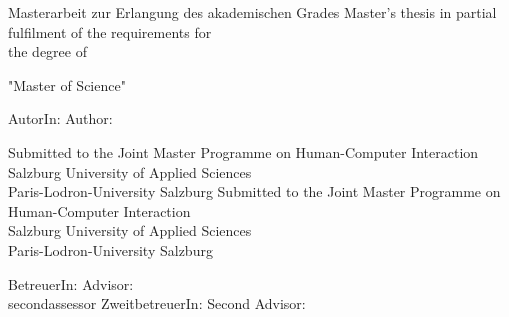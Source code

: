 \begin{titlepage}

\newcommand{\printsecondassessor}[1]{%
  \ifcsname#1\endcsname%
  \ifhcilanguagegerman ZweitbetreuerIn: \else Second Advisor: \fi \secondassessor 
  \else%
    
  \fi%
}

\ifhcimasterthesis

    
    
    \newpage
    
    \thispagestyle{empty}
    
    
    \vspace*{2cm}
    \Large{
    
    \titlename
     
    \vspace*{1cm}
    
    \ifhcilanguagegerman
    Masterarbeit zur Erlangung des akademischen Grades
    \else
    Master's thesis in partial fulfilment of the requirements for\\ the degree of 
    \fi
    
    \vspace*{0.5cm}
    
    {"Master of Science"}
    }
    
    
    \vspace*{1.5cm}
    {\large
    \ifhcilanguagegerman AutorIn: \else Author: \fi \authorname
    }
    \vfill
    
    {\normalsize
    \ifhcilanguagegerman
    Submitted to the Joint Master Programme on Human-Computer Interaction
    \\Salzburg University of Applied Sciences
    \\Paris-Lodron-University Salzburg
    \else
    Submitted to the Joint Master Programme on Human-Computer Interaction
    \\Salzburg University of Applied Sciences
    \\Paris-Lodron-University Salzburg
    \fi
    
    
    \vspace*{1cm}
    
    \ifhcilanguagegerman BetreuerIn: \else Advisor: \fi
    \supervisor
    \\    
    \printsecondassessor{secondassessor}
    
}
\end{titlepage}
